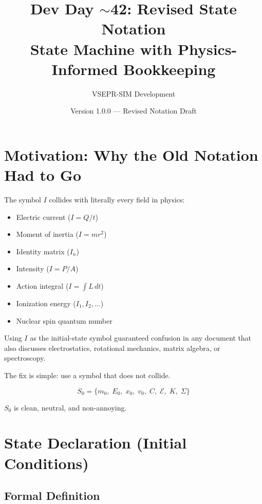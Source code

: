 \documentclass[11pt]{article}
\title{\textbf{Dev Day $\sim$42: Revised State Notation} \\
\Large State Machine with Physics-Informed Bookkeeping}
\author{VSEPR-SIM Development}
\date{Version 1.0.0 --- Revised Notation Draft}
\begin{document}
\maketitle
\tableofcontents
\newpage

\section{Motivation: Why the Old Notation Had to Go}

The symbol $I$ collides with literally every field in physics:
\begin{itemize}
  \item Electric current ($I = Q/t$)
  \item Moment of inertia ($I = mr^2$)
  \item Identity matrix ($I_n$)
  \item Intensity ($I = P/A$)
  \item Action integral ($I = \int L \, dt$)
  \item Ionization energy ($I_1, I_2, \ldots$)
  \item Nuclear spin quantum number
\end{itemize}

Using $I$ as the initial-state symbol guaranteed confusion in any document that also discusses electrostatics, rotational mechanics, matrix algebra, or spectroscopy.

The fix is simple: use a symbol that does not collide.

\begin{equation}
\boxed{S_0 = \{m_0, \; E_0, \; x_0, \; v_0, \; C, \; \mathcal{E}, \; K, \; \Sigma\}}
\end{equation}

$S_0$ is clean, neutral, and non-annoying.

\section{State Declaration (Initial Conditions)}

\subsection{Formal Definition}
\end{document}
